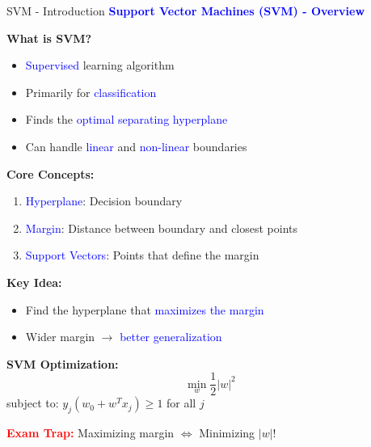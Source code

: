 \documentclass[8pt]{beamer}
\begin{document}
	
	\begin{frame}{SVM - Introduction}
		\fontsize{6.5}{7.5}\selectfont
		\textcolor{blue}{\textbf{Support Vector Machines (SVM) - Overview}}
		
		\textbf{What is SVM?}
		\begin{itemize}
			\item \textcolor{blue}{Supervised} learning algorithm
			\item Primarily for \textcolor{blue}{classification}
			\item Finds the \textcolor{blue}{optimal separating hyperplane}
			\item Can handle \textcolor{blue}{linear} and \textcolor{blue}{non-linear} boundaries
		\end{itemize}
		
		\textbf{Core Concepts:}
		\begin{enumerate}
			\item \textcolor{blue}{Hyperplane}: Decision boundary
			\item \textcolor{blue}{Margin}: Distance between boundary and closest points
			\item \textcolor{blue}{Support Vectors}: Points that define the margin
		\end{enumerate}
		
		\textbf{Key Idea:}
		\begin{itemize}
			\item Find the hyperplane that \textcolor{blue}{maximizes the margin}
			\item Wider margin $\rightarrow$ \textcolor{blue}{better generalization}
		\end{itemize}
		
		\textbf{SVM Optimization:}
		\[
		\min_{w} \frac{1}{2}|w|^2
		\]
		subject to: $y_j(w_0 + w^T x_j) \geq 1$ for all $j$
		
		\textcolor{red}{\textbf{Exam Trap:}} Maximizing margin $\Leftrightarrow$ Minimizing $|w|$!
	\end{frame}
	
\end{document}
